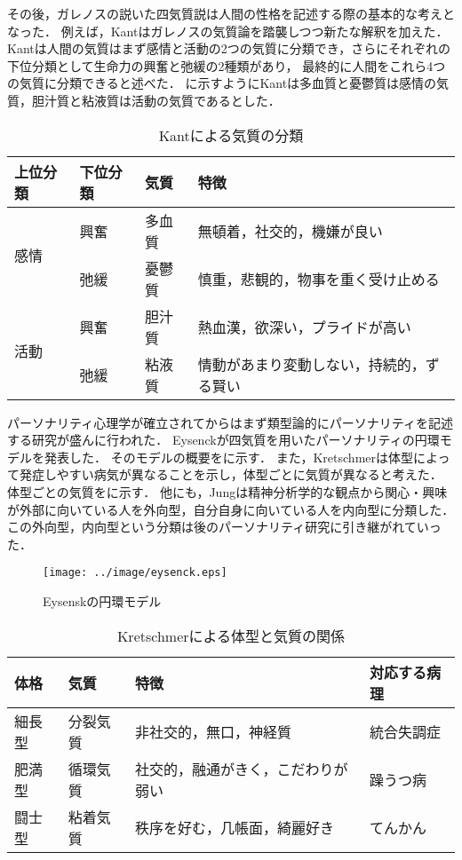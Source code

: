 その後，ガレノスの説いた四気質説は人間の性格を記述する際の基本的な考えとなった．
例えば，Kantはガレノスの気質論を踏襲しつつ新たな解釈を加えた\cite{kant}．
Kantは人間の気質はまず感情と活動の2つの気質に分類でき，さらにそれぞれの下位分類として生命力の興奮と弛緩の2種類があり，
最終的に人間をこれら4つの気質に分類できると述べた．
に示すようにKantは多血質と憂鬱質は感情の気質，胆汁質と粘液質は活動の気質であるとした．

\begin{table}[tb]
    \centering
    \caption{Kantによる気質の分類}
    \begin{tabular}{llll} \toprule
        上位分類 & 下位分類 & 気質 & 特徴 \\ \midrule
        \multirow{2}{*}{感情} & 興奮 & 多血質 & 無頓着，社交的，機嫌が良い \\
        & 弛緩 & 憂鬱質 & 慎重，悲観的，物事を重く受け止める \\ \midrule
        \multirow{2}{*}{活動} & 興奮 & 胆汁質 & 熱血漢，欲深い，プライドが高い \\ 
        & 弛緩 & 粘液質 & 情動があまり変動しない，持続的，ずる賢い \\ \bottomrule
    \end{tabular}
    \label{tab:kant}
\end{table}

パーソナリティ心理学が確立されてからはまず類型論的にパーソナリティを記述する研究が盛んに行われた．
Eysenck\cite{eysenck-1963}が四気質を用いたパーソナリティの円環モデルを発表した．
そのモデルの概要をに示す．
また，Kretschmer\cite{kretschmer}は体型によって発症しやすい病気が異なることを示し，体型ごとに気質が異なると考えた．
体型ごとの気質をに示す．
他にも，Jung\cite{jung}は精神分析学的な観点から関心・興味が外部に向いている人を外向型，自分自身に向いている人を内向型に分類した．
この外向型，内向型という分類は後のパーソナリティ研究に引き継がれていった．

\begin{figure}[tb]
    \centering
    \texttt{[image: ../image/eysenck.eps]}
    \caption[Eysenskの円環モデル]{Eysenskの円環モデル \protect \footnotemark}
    \label{fig:eysenck}
\end{figure}

\begin{table}[tb]
    \centering
    \caption[Kretschmerによる体型と気質の関係]{Kretschmerによる体型と気質の関係 \protect \footnotemark}
    \begin{tabular}{llll} \toprule
        体格 & 気質 & 特徴 & 対応する病理 \\ \midrule
        細長型 & 分裂気質 & 非社交的，無口，神経質 & 統合失調症 \\
        肥満型 & 循環気質 & 社交的，融通がきく，こだわりが弱い & 躁うつ病 \\
        闘士型 & 粘着気質 & 秩序を好む，几帳面，綺麗好き & てんかん \\ \bottomrule
    \end{tabular}
    \label{tab:kretschmer}
\end{table}

